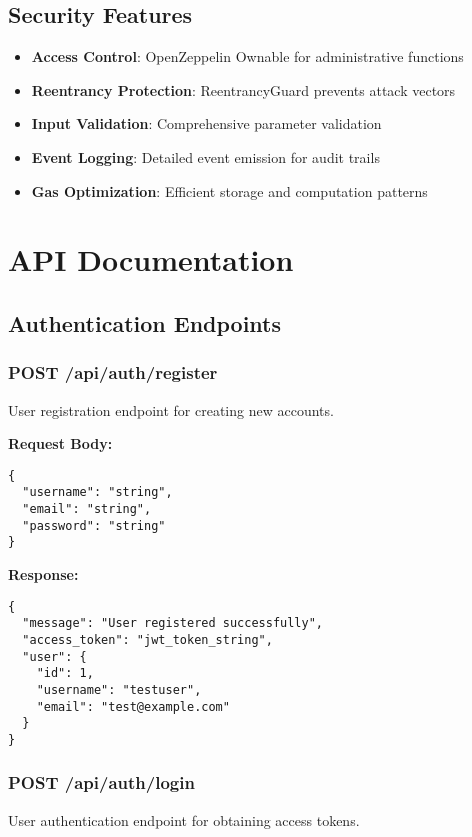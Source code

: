 \documentclass[11pt,a4paper]{article}
\begin{document}
\subsection{Security Features}

\begin{itemize}
    \item \textbf{Access Control}: OpenZeppelin Ownable for administrative functions
    \item \textbf{Reentrancy Protection}: ReentrancyGuard prevents attack vectors
    \item \textbf{Input Validation}: Comprehensive parameter validation
    \item \textbf{Event Logging}: Detailed event emission for audit trails
    \item \textbf{Gas Optimization}: Efficient storage and computation patterns
\end{itemize}

\section{API Documentation}

\subsection{Authentication Endpoints}

\subsubsection{POST /api/auth/register}
User registration endpoint for creating new accounts.

\textbf{Request Body:}
\begin{lstlisting}[style=javascript]
{
  "username": "string",
  "email": "string",
  "password": "string"
}
\end{lstlisting}

\textbf{Response:}
\begin{lstlisting}[style=javascript]
{
  "message": "User registered successfully",
  "access_token": "jwt_token_string",
  "user": {
    "id": 1,
    "username": "testuser",
    "email": "test@example.com"
  }
}
\end{lstlisting}

\subsubsection{POST /api/auth/login}
User authentication endpoint for obtaining access tokens.
\end{document}
